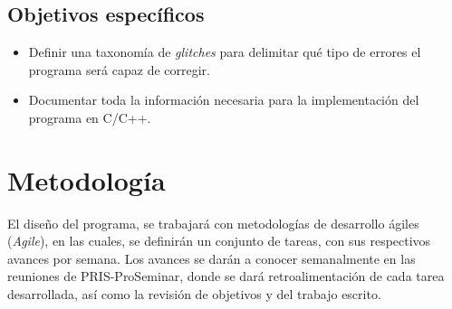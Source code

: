\subsection{Objetivos específicos}

\begin{itemize}
\item Definir una taxonomía de \textit{glitches} para delimitar qué tipo de errores el programa será capaz de corregir.
\item Documentar toda la información necesaria para la implementación del programa en C/C++.

\end{itemize}

\section{Metodología}

El diseño del programa, se trabajará con metodologías de desarrollo ágiles (\textit{Agile}), en las cuales, se definirán un conjunto de tareas, con sus respectivos avances por semana. Los avances se darán a conocer semanalmente en las reuniones de PRIS-ProSeminar, donde se dará retroalimentación de cada tarea desarrollada, así como la revisión de objetivos y del trabajo escrito.